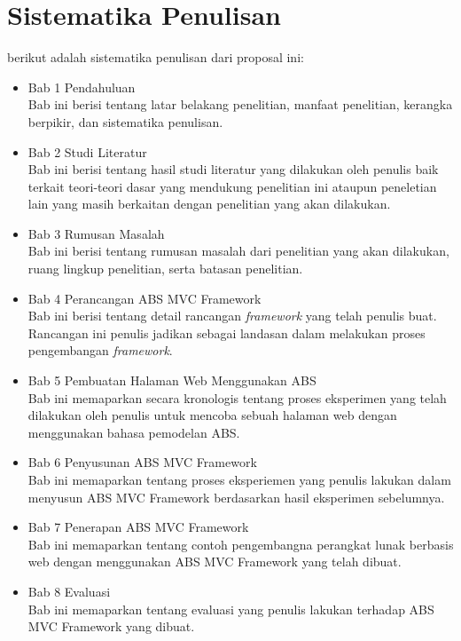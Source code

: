 \section{Sistematika Penulisan}
berikut adalah sistematika penulisan dari proposal ini:
\begin{itemize}
    \item Bab 1 Pendahuluan \\
    Bab ini berisi tentang latar belakang penelitian, manfaat penelitian, kerangka berpikir, dan sistematika penulisan.
    \item Bab 2 Studi Literatur \\
    Bab ini berisi tentang hasil studi literatur yang dilakukan oleh penulis baik terkait teori-teori dasar yang mendukung penelitian ini ataupun peneletian lain yang masih berkaitan dengan penelitian yang akan dilakukan.
    \item Bab 3 Rumusan Masalah \\
    Bab ini berisi tentang rumusan masalah dari penelitian yang akan dilakukan, ruang lingkup penelitian, serta batasan penelitian.
    \item Bab 4 Perancangan ABS MVC Framework \\
    Bab ini berisi tentang detail rancangan \textit{framework} yang telah penulis buat. Rancangan ini penulis jadikan sebagai landasan dalam melakukan proses pengembangan \textit{framework}.
    \item Bab 5 Pembuatan Halaman Web Menggunakan ABS \\
    Bab ini memaparkan secara kronologis tentang proses eksperimen yang telah dilakukan oleh penulis untuk mencoba sebuah halaman web dengan menggunakan bahasa pemodelan ABS.
    \item Bab 6 Penyusunan ABS MVC Framework \\
    Bab ini memaparkan tentang proses eksperiemen yang penulis lakukan dalam menyusun ABS MVC Framework berdasarkan hasil eksperimen sebelumnya.
    \item Bab 7 Penerapan ABS MVC Framework \\
    Bab ini memaparkan tentang contoh pengembangna perangkat lunak berbasis web dengan menggunakan ABS MVC Framework yang telah dibuat.
    \item Bab 8 Evaluasi \\
    Bab ini memaparkan tentang evaluasi yang penulis lakukan terhadap ABS MVC Framework yang dibuat.
\end{itemize}